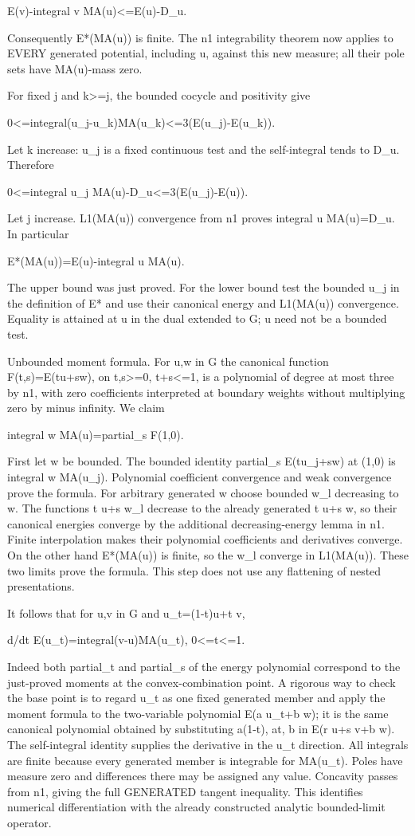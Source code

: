 \documentclass[11pt]{article}
\begin{document}
E(v)-integral v MA(u)<=E(u)-D\_u.

Consequently E*(MA(u)) is finite. The n1 integrability theorem now applies to EVERY generated potential, including u, against this new measure; all their pole sets have MA(u)-mass zero.

For fixed j and k>=j, the bounded cocycle and positivity give

0<=integral(u\_j-u\_k)MA(u\_k)<=3(E(u\_j)-E(u\_k)).

Let k increase: u\_j is a fixed continuous test and the self-integral tends to D\_u. Therefore

0<=integral u\_j MA(u)-D\_u<=3(E(u\_j)-E(u)).

Let j increase. L1(MA(u)) convergence from n1 proves integral u MA(u)=D\_u. In particular

E*(MA(u))=E(u)-integral u MA(u).

The upper bound was just proved. For the lower bound test the bounded u\_j in the definition of E* and use their canonical energy and L1(MA(u)) convergence. Equality is attained at u in the dual extended to G; u need not be a bounded test.

Unbounded moment formula. For u,w in G the canonical function F(t,s)=E(tu+sw), on t,s>=0, t+s<=1, is a polynomial of degree at most three by n1, with zero coefficients interpreted at boundary weights without multiplying zero by minus infinity. We claim

integral w MA(u)=partial\_s F(1,0).

First let w be bounded. The bounded identity partial\_s E(tu\_j+sw) at (1,0) is integral w MA(u\_j). Polynomial coefficient convergence and weak convergence prove the formula. For arbitrary generated w choose bounded w\_l decreasing to w. The functions t u+s w\_l decrease to the already generated t u+s w, so their canonical energies converge by the additional decreasing-energy lemma in n1. Finite interpolation makes their polynomial coefficients and derivatives converge. On the other hand E*(MA(u)) is finite, so the w\_l converge in L1(MA(u)). These two limits prove the formula. This step does not use any flattening of nested presentations.

It follows that for u,v in G and u\_t=(1-t)u+t v,

d/dt E(u\_t)=integral(v-u)MA(u\_t), 0<=t<=1.

Indeed both partial\_t and partial\_s of the energy polynomial correspond to the just-proved moments at the convex-combination point. A rigorous way to check the base point is to regard u\_t as one fixed generated member and apply the moment formula to the two-variable polynomial E(a u\_t+b w); it is the same canonical polynomial obtained by substituting a(1-t), at, b in E(r u+s v+b w). The self-integral identity supplies the derivative in the u\_t direction. All integrals are finite because every generated member is integrable for MA(u\_t). Poles have measure zero and differences there may be assigned any value. Concavity passes from n1, giving the full GENERATED tangent inequality. This identifies numerical differentiation with the already constructed analytic bounded-limit operator.
\end{document}
